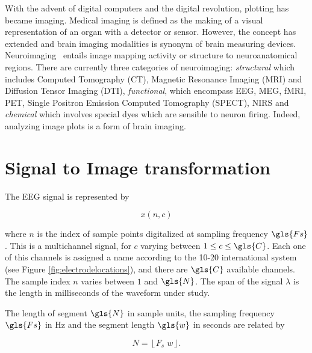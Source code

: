
\begin{story}[Neuroimaging]
With the advent of digital computers and the digital revolution, plotting has became imaging.  Medical imaging is defined as the making of a visual representation of an organ with a detector or sensor.  However, the concept has extended and brain imaging modalities is  synonym of brain measuring devices.  Neuroimaging~\cite{Freeman2013} entails image mapping activity or structure to neuroanatomical regions.  There are currently three categories of neuroimaging: \textit{structural} which includes Computed Tomography (CT), Magnetic Resonance Imaging (MRI) and Diffusion Tensor Imaging (DTI), \textit{functional}, which encompass EEG, MEG, fMRI, PET, Single Positron Emission Computed Tomography (SPECT), NIRS and \textit{chemical} which involves special dyes which are sensible to neuron firing.  Indeed, analyzing image plots is a form of brain imaging.
\end{story}


\section{Signal to Image transformation}

The EEG signal is represented by

\begin{equation}
x(n,c)
\label{eq:eegdefinition}
\end{equation}

\noindent where $n$ is the index of sample points digitalized at sampling frequency $\gls{Fs}$.  This is a multichannel signal, for $c$ varying between  $1 \leq c \leq \gls{C}$.  Each one of this channels is assigned a name according to the 10-20 international system (see Figure \ref{fig:electrodelocations}), and there are $\gls{C}$ available channels. The sample index $n$ varies between $1$ and $\gls{N}$.  The span of the signal $\lambda$ is the length in milliseconds of the waveform under study. 

The length of segment $\gls{N}$ in sample units, the sampling frequency $\gls{Fs}$ in \si{\hertz} and the segment length $\gls{w}$ in seconds are related by

\begin{equation}
N = \left\lfloor F_s \; w \right\rfloor.
\label{eq:segmentlength}
\end{equation}

